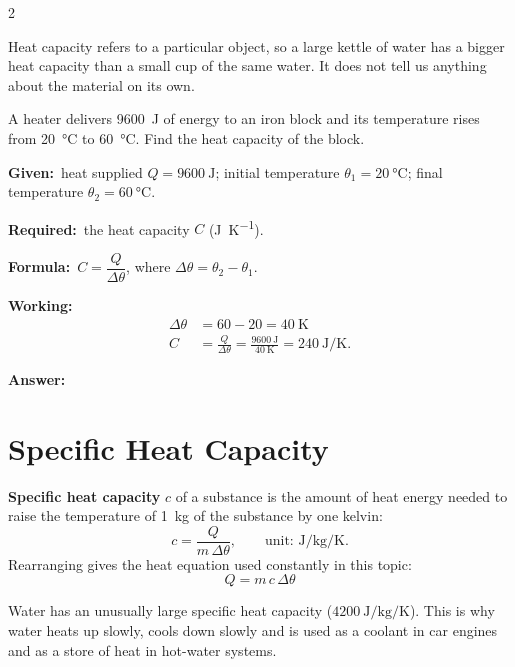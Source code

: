 \documentclass[10pt]{article}
\makeatletter
\let\theme@oldsection\section
\renewcommand{\section}{%
  \needspace{8\baselineskip}%
  \theme@oldsection}
\newcommand{\Given}{\par\vspace{2pt}\textbf{Given:}\ }
\newcommand{\Required}{\par\vspace{2pt}\textbf{Required:}\ }
\newcommand{\Formula}{\par\vspace{2pt}\textbf{Formula:}\ }
\newcommand{\Working}{\par\vspace{2pt}\textbf{Working:}}
\newcommand{\Answer}[1]{\par\vspace{2pt}\textbf{Answer:}\ \fbox{#1}}
\makeatother
\begin{document}
\begin{multicols}{2}
\begin{nb}
Heat capacity refers to a particular object, so a large kettle of water
has a bigger heat capacity than a small cup of the same water. It does
not tell us anything about the material on its own.
\end{nb}

\begin{example}
A heater delivers \SI{9600}{\joule} of energy to an iron block and its
temperature rises from \SI{20}{\degreeCelsius} to
\SI{60}{\degreeCelsius}. Find the heat capacity of the block.
\tcblower
\Given heat supplied $Q = \SI{9600}{\joule}$;
initial temperature $\theta_1 = \SI{20}{\degreeCelsius}$;
final temperature $\theta_2 = \SI{60}{\degreeCelsius}$.
\Required the heat capacity $C$ (\si{\joule\per\kelvin}).
\Formula $C = \dfrac{Q}{\Delta\theta}$, where
$\Delta\theta = \theta_2 - \theta_1$.
\Working
\begin{align*}
  \Delta\theta &= 60 - 20 = \SI{40}{\kelvin} \\
  C &= \frac{Q}{\Delta\theta} = \frac{\SI{9600}{\joule}}{\SI{40}{\kelvin}}
       = \SI{240}{\joule\per\kelvin}.
\end{align*}
\Answer{$C = \SI{240}{\joule\per\kelvin}$}
\end{example}

\section{Specific Heat Capacity}
\begin{definition}
\textbf{Specific heat capacity} $c$ of a substance is the amount of
heat energy needed to raise the temperature of \SI{1}{\kilogram} of the
substance by one kelvin:
\[
  c = \frac{Q}{m\,\Delta\theta}, \qquad
  \text{unit: } \si{\joule\per\kilogram\per\kelvin}.
\]
Rearranging gives the heat equation used constantly in this topic:
\[
  \boxed{\,Q = m\,c\,\Delta\theta\,}
\]
\end{definition}

\begin{nb}
Water has an unusually large specific heat capacity
($\SI{4200}{\joule\per\kilogram\per\kelvin}$). This is why water heats
up slowly, cools down slowly and is used as a coolant in car engines
and as a store of heat in hot-water systems.
\end{nb}


\end{multicols}
\end{document}
